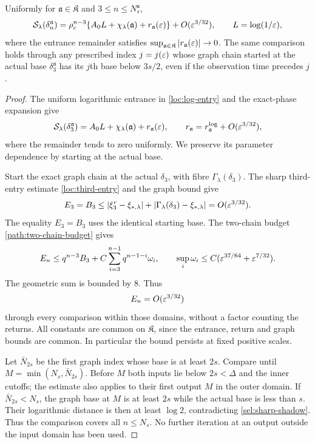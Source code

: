 \begin{lemma}
\label{sel:sharp-phase}
Uniformly for $\mathfrak a\in\mathfrak K$ and
$3\le n\le N_s^{\mathfrak a}$,
\begin{equation}
 \mathcal S_\lambda(\delta_n^{\mathfrak a})
 =\rho_c^{n-3}\{A_0L+\chi_\lambda(\mathfrak a)+r_{\mathfrak a}(\varepsilon)\}
       +O(\varepsilon^{3/32}),
 \qquad L=\log(1/\varepsilon),
 \label{sel:sharp-phase-formula}
\end{equation}
where the entrance remainder satisfies
$\sup_{\mathfrak a\in\mathfrak K}|r_{\mathfrak a}(\varepsilon)|\to0$.
The same comparison holds through any prescribed index $j=j(\varepsilon)$
whose graph chain started at the actual base $\delta_3^{\mathfrak a}$ has
its $j$th base below $3s/2$, even if the observation time precedes $j$.
\end{lemma}
\begin{proof}
The uniform logarithmic entrance in \eqref{loc:log-entry} and
the exact-phase expansion give
\begin{equation}
 \mathcal S_\lambda(\delta_3^{\mathfrak a})
 =A_0L+\chi_\lambda(\mathfrak a)+r_{\mathfrak a}(\varepsilon),
 \qquad
 r_{\mathfrak a}=r_{\mathfrak a}^{\log}+O(\varepsilon^{3/32}),
 \label{sel:uniform-entry-phase}
\end{equation}
where the remainder tends to zero uniformly. We preserve its
parameter dependence by starting at the actual base.

Start the exact graph chain at the actual $\delta_3$, with fibre
$\Gamma_\lambda(\delta_3)$. The sharp third-entry estimate
\eqref{loc:third-entry} and the graph bound give
\begin{equation}
 E_3=B_3\le
 |\xi_3^r-\xi_{*,\lambda}|+
 |\Gamma_\lambda(\delta_3)-\xi_{*,\lambda}|
 =O(\varepsilon^{3/32}).
 \label{sel:sharp-start}
\end{equation}
The equality $E_3=B_3$ uses the identical starting base. The
two-chain budget \eqref{path:two-chain-budget} gives
\[
 E_n\le q^{n-3}B_3+
 C\sum_{i=3}^{n-1}q^{n-1-i}\omega_i,
 \qquad
 \sup_i\omega_i\le C(\varepsilon^{37/64}+\varepsilon^{7/32}).
\]
The geometric sum is bounded by $8$. Thus
\begin{equation}
 E_n=O(\varepsilon^{3/32})
 \label{sel:sharp-shadow}
\end{equation}
through every comparison within those domains, without a factor counting the returns.
All constants are common on $\mathfrak K$, since the entrance,
return and graph bounds are common. In particular the bound persists
at fixed positive scales.

Let $\bar N_{2s}$ be the first graph index whose base is at least
$2s$. Compare until $M=\min(N_s,\bar N_{2s})$. Before $M$ both
inputs lie below $2s<\Delta$ and the inner cutoffs; the estimate
also applies to their first output $M$ in the outer domain.
If $\bar N_{2s}<N_s$, the graph base at $M$ is at least $2s$ while
the actual base is less than $s$. Their logarithmic distance is then
at least $\log2$, contradicting \eqref{sel:sharp-shadow}. Thus the
comparison covers all $n\le N_s$. No further iteration at an output
outside the input domain has been used.


\end{proof}
